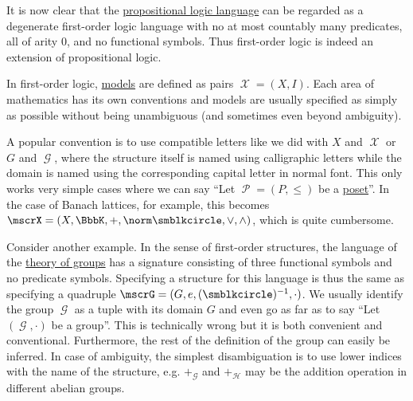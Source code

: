 \begin{remark}\label{rem:propositional_logic_as_first_order_logic}
  It is now clear that the \hyperref[subsec:propositional_logic]{propositional logic language} can be regarded as a degenerate first-order logic language with no at most countably many predicates, all of arity 0, and no functional symbols. Thus first-order logic is indeed an extension of propositional logic.
\end{remark}

\begin{remark}\label{rem:first_order_model_notation}
  In first-order logic, \hyperref[def:first_order_semantics/satisfiability]{models} are defined as pairs \( \mscrX = (X, I) \). Each area of mathematics has its own conventions and models are usually specified as simply as possible without being unambiguous (and sometimes even beyond ambiguity).

  A popular convention is to use compatible letters like we did with \( X \) and \( \mscrX \) or \( G \) and \( \mscrG \), where the structure itself is named using calligraphic letters while the domain is named using the corresponding capital letter in normal font. This only works very simple cases where we can say \enquote{Let \( \mscrP = (P, \leq) \) be a \hyperref[def:poset]{poset}}. In the case of Banach lattices, for example, this becomes \( \mscrX = (X, \BbbK, +, \norm \placeholder, \vee, \wedge) \), which is quite cumbersome.

  Consider another example. In the sense of first-order structures, the language of the \hyperref[def:group/theory]{theory of groups} has a signature consisting of three functional symbols and no predicate symbols. Specifying a structure for this language is thus the same as specifying a quadruple \( \mscrG = (G, e, (\placeholder)^{-1}, \cdot) \). We usually identify the group \( \mscrG \) as a tuple with its domain \( G \) and even go as far as to say \enquote{Let \( (\mscrG, \cdot) \) be a group}. This is technically wrong but it is both convenient and conventional. Furthermore, the rest of the definition of the group can easily be inferred. In case of ambiguity, the simplest disambiguation is to use lower indices with the name of the structure, e.g. \( +_\mscrG \) and \( +_\mscrH \) may be the addition operation in different abelian groups.
\end{remark}
